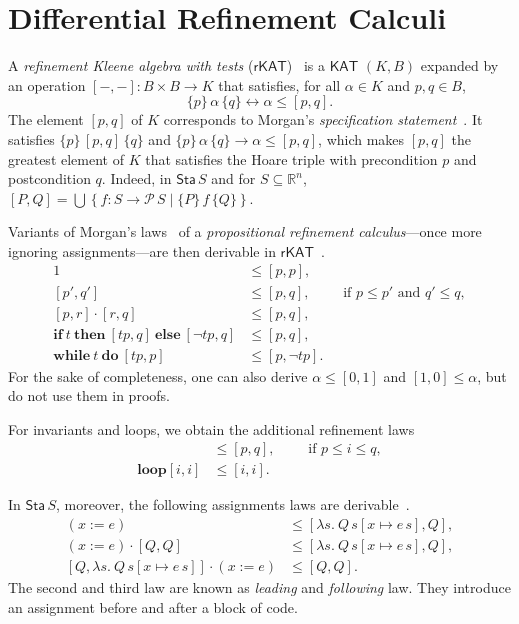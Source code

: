 \documentclass[envcountsame,envcountsect]{llncs}
\newcommand{\IF}[3]{\mathbf{if}\ #1\ \mathbf{then}\ #2\ \mathbf{else}\ #3}
\newcommand{\WHILE}[2]{\mathbf{while}\ #1\ \mathbf{do}\ #2}
\newcommand{\KAT}{\mathsf{KAT}}
\newcommand{\rKAT}{\mathsf{rKAT}}
\newcommand{\Pow}{\mathcal{P}}
\newcommand{\reals}{\mathbb{R}}
\newcommand{\sta}{\mathsf{Sta}}
\begin{document}

\section{Differential Refinement Calculi}\label{sec:refine}

A \emph{refinement Kleene algebra with tests}
($\rKAT$)~\cite{ArmstrongGS16}  is a $\KAT$
$(K,B)$ expanded by an operation $[-,-]:B\times B\to K$ that
satisfies, for all $\alpha \in K$ and $p,q\in B$, 
\begin{equation*}
  \{p\}\, \alpha\, \{q\} \leftrightarrow \alpha\le [p,q].
\end{equation*}
The element $[p,q]$ of $K$ corresponds to Morgan's \emph{specification
  statement}~\cite{Morgan94}. It satisfies $\{p\}\, [p,q]\, \{q\}$
and $\{p\}\, \alpha\, \{q\} \rightarrow \alpha\le [p,q]$, 
which makes $[p,q]$ the greatest element of $K$ that satisfies the Hoare
triple with precondition $p$ and postcondition $q$.  Indeed, in
$\sta\, S$ and for $S\subseteq \reals^n$,
$ [P,Q] = \bigcup \left\{f:S\to \Pow\, S \mid \{P\}\, f\,
  \{Q\}\right\}$. 

Variants of Morgan's laws~\cite{Morgan94} of a \emph{propositional
  refinement calculus}---once more ignoring assignments---are then derivable in
$\rKAT$~\cite{ArmstrongGS16}.
\begin{align}
  1 &\le [p,p],\label{eq:r-skip}\tag{r-skip}\\
[p',q'] &\le [p,q],\qquad \text{ if } p\le p'\text{ and } q'\le q,\label{eq:r-cons}\tag{r-cons}\\
[p,r]\cdot [r,q] &\le [p,q],\label{eq:r-seq}\tag{r-seq}\\
\IF{t}{[tp,q]}{[\neg tp,q]} &\le [p,q],\label{eq:r-cond}\tag{r-cond}\\
 \WHILE{t}{[tp,p]} &\le [p,\neg tp]. \label{eq:r-while}\tag{r-while}
\end{align}
For the sake of completeness, one can also derive $\alpha \le [0,1]$ and $[1,0] \le \alpha$, but do not use them in proofs.

For invariants and loops, we obtain the additional refinement laws
\begin{align}
  [i,i] &\le [p,q],\qquad \text{ if } p\le i \le q,\label{eq:r-inv}\tag{r-inv}\\
\mathbf{loop} [i,i] &\le [i,i]. \label{eq:r-loop}\tag{r-loop}
\end{align}

In $\sta\, S$, moreover, the following assignments laws are
derivable~\cite{ArmstrongGS16}.
\begin{align}
 (x := e)  &\le  \left[\lambda s.\ Q\, s[x\mapsto e\, s],Q\right],\label{eq:r-assgn}\tag{r-assgn}\\
(x:= e) \cdot \left[Q,Q\right] &\le [\lambda s.\ Q\, s[x\mapsto e\, s],Q],\label{eq:r-assgn}\tag{r-assgnl}\\
\left[Q,\lambda s.\ Q\, s[x\mapsto e\, s]\right]\cdot (x:=e) &\le [Q,Q]. \label{eq:r-assgn}\tag{r-assgnf}
\end{align}
The second and third law are known as \emph{leading} and \emph{following}
law. They introduce an assignment before and after a block of code. 
\end{document}
